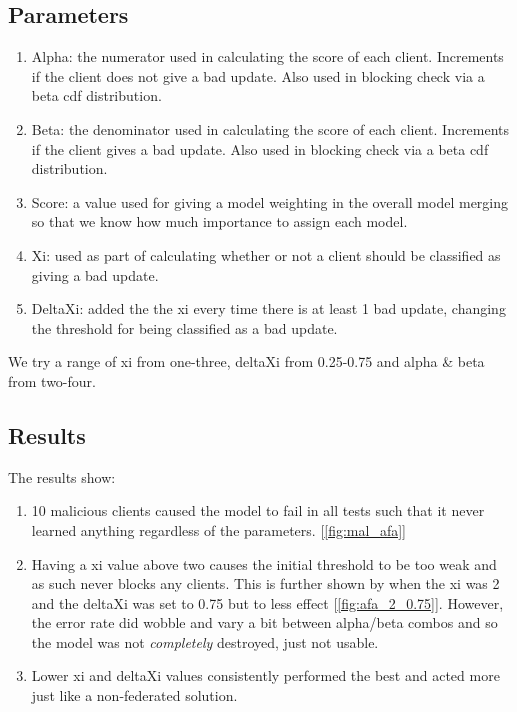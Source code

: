 \subsection{Parameters}
\begin{enumerate}
    \item Alpha: the numerator used in calculating the score of each client. Increments if the client does not give a bad update. Also used in blocking check via a beta cdf distribution.
    \item Beta: the denominator used in calculating the score of each client. Increments if the client gives a bad update. Also used in blocking check via a beta cdf distribution.
    \item Score: a value used for giving a model weighting in the overall model merging so that we know how much importance to assign each model.
    \item Xi: used as part of calculating whether or not a client should be classified as giving a bad update.
    \item DeltaXi: added the the xi every time there is at least 1 bad update, changing the threshold for being classified as a bad update.
\end{enumerate}
We try a range of xi from one-three, deltaXi from 0.25-0.75 and alpha \& beta from two-four.

\subsection{Results}
The results show:
\begin{enumerate}
    \item 10 malicious clients caused the model to fail in all tests such that it never learned anything regardless of the parameters. [\ref{fig:mal_afa}]
    \item Having a xi value above two causes the initial threshold to be too weak and as such never blocks any clients. This is further shown by when the xi was 2 and the deltaXi was set to 0.75 but to less effect [\ref{fig:afa_2_0.75}]. 
    However, the error rate did wobble and vary a bit between alpha/beta combos and so the model was not \textit{completely} destroyed, just not usable.
    \item Lower xi and deltaXi values consistently performed the best and acted more just like a non-federated solution.
\end{enumerate}

